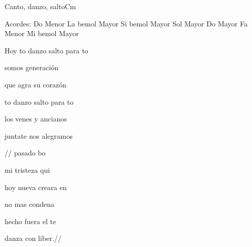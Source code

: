 \documentclass[12pt, spanish]{book}
\begin{document}
\begin{song}{Canto, danzo, salto}{Cm}
        \ifChordBk
        \begin{SBOpGroup}
            Acordes:\break
            \upchord{\Cm}\qquad Do Menor \hfill
            \upchord{\Aflat}\qquad La bemol Mayor \hfill\null\break
            \upchord{\Bflat}\qquad\qquad Si bemol Mayor \hfill
            \upchord{\G}\qquad Sol Mayor \hfill\null\break
            \upchord{\C}\qquad Do Mayor \hfill
            \upchord{\Fm}\qquad Fa Menor \hfill\null\break
            \upchord{\Eflat}\qquad Mi bemol Mayor \hfill
        \end{SBOpGroup}
        \fi
        \begin{SBExtraKeys}{


            \begin{SBChorus}
                Hoy  to danzo salto para  to

                somos    generación

                que agra su corazón

                to danzo salto para  to

                los venes y ancianos

                juntate nos alegramos
            \end{SBChorus}

            \begin{SBOpGroup}
                //  pasado bo

                mi tristeza qui

                hoy nueva creara    en 

                no mas condena

                hecho fuera el te

                danza  con liber.//~
            \end{SBOpGroup}

}
\end{SBExtraKeys}
\end{song}
\end{document}
